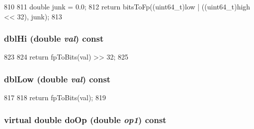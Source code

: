 \begin{DoxyCode}
810     {
811         double junk = 0.0;
812         return bitsToFp((uint64_t)low | ((uint64_t)high << 32), junk);
813     }
\end{DoxyCode}
\hypertarget{classArmISA_1_1FpOp_a0a20a848b3881593f6250834f4c4e53d}{
\subsubsection[{dblHi}]{ dblHi (double {\em val}) const}}
\label{classArmISA_1_1FpOp_a0a20a848b3881593f6250834f4c4e53d}



\begin{DoxyCode}
823     {
824         return fpToBits(val) >> 32;
825     }
\end{DoxyCode}
\hypertarget{classArmISA_1_1FpOp_af317a029a04e1eb855f20b3c76aa2d79}{
\subsubsection[{dblLow}]{ dblLow (double {\em val}) const}}
\label{classArmISA_1_1FpOp_af317a029a04e1eb855f20b3c76aa2d79}



\begin{DoxyCode}
817     {
818         return fpToBits(val);
819     }
\end{DoxyCode}
\hypertarget{classArmISA_1_1FpOp_ad1ec33e89716d3410e023846aaab378e}{
\subsubsection[{doOp}]{\setlength{\rightskip}{0pt plus 5cm}virtual double doOp (double {\em op1}) const}}
\label{classArmISA_1_1FpOp_ad1ec33e89716d3410e023846aaab378e}



